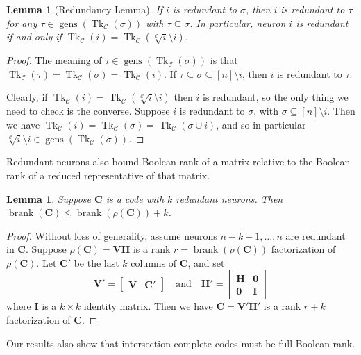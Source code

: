 \documentclass[11pt,letterpaper, reqno]{amsart}
\newtheorem{lem}[thm]{Lemma}         %
\theoremstyle{definition}
\DeclareMathOperator{\tk}{Tk}
\DeclareMathOperator{\gens}{gens}
\DeclareMathOperator{\brank}{brank}
\def\bC{\mathbf{C}}
\def\bH{\mathbf{H}}
\def\bI{\mathbf{I}}
\def\bV{\mathbf{V}}
\def\cC{\mathcal{C}}
\begin{document}
    \begin{lem}[Redundancy Lemma]\label{lem:redundancylemma}
        If $i$ is redundant to $\sigma$, then $i$ is redundant to $\tau$ for any $\tau \in \gens(\tk_\cC(\sigma))$ with $\tau \subseteq \sigma$.
        In particular, neuron $i$ is redundant if and only if $\tk_\cC(i) = \tk_\cC(\sqrt[\cC]{i} \setminus i)$.
    \end{lem}
    
    \begin{proof}
        The meaning of $\tau \in \gens(\tk_\cC(\sigma))$ is that $\tk_\cC(\tau) = \tk_\cC(\sigma) = \tk_\cC(i)$. If $\tau \subseteq \sigma \subseteq [n] \setminus i$, then $i$ is redundant to $\tau$.
        
        Clearly, if $\tk_\cC(i) = \tk_\cC(\sqrt[\cC]{i} \setminus i)$ then $i$ is redundant, so the only thing we need to check is the converse. Suppose $i$ is redundant to $\sigma$, with $\sigma \subseteq [n] \setminus i$. Then we have $\tk_\cC(i) = \tk_\cC(\sigma) = \tk_\cC(\sigma\cup i)$, and so in particular $\sqrt[\cC]{i} \setminus i \in \gens(\tk_\cC(\sigma))$. 
    \end{proof}
    

    Redundant neurons also bound Boolean rank of a matrix relative to the Boolean rank of a reduced representative of that matrix.
    \begin{lem}\label{lem:redundancybound}
        Suppose $\bC$ is a code with $k$ redundant neurons. Then $\brank(\bC) \leq \brank(\rho(\bC)) + k$.
    \end{lem}
    \begin{proof}
        Without loss of generality, assume neurons $n-k+1,\dots,n$ are redundant in $\bC$. Suppose $\rho(\bC) = \bV\bH$ is a rank $r = \brank(\rho(\bC))$ factorization of $\rho(\bC)$. Let $\bC'$ be the last $k$ columns of $\bC$, and set
        \[\bV' = \begin{bmatrix}
            \bV & \bC'
        \end{bmatrix}
        \quad \text{and}\quad
        \bH' = \begin{bmatrix}
            \bH & \mathbf{0}\\
            \mathbf{0} & \bI
        \end{bmatrix}\]
        where $\bI$ is a $k \times k$ identity matrix. Then we have $\bC = \bV'\bH'$ is a rank $r + k$ factorization of $\bC$.
    \end{proof}

        Our results also show that intersection-complete codes must be full Boolean rank.
\end{document}
